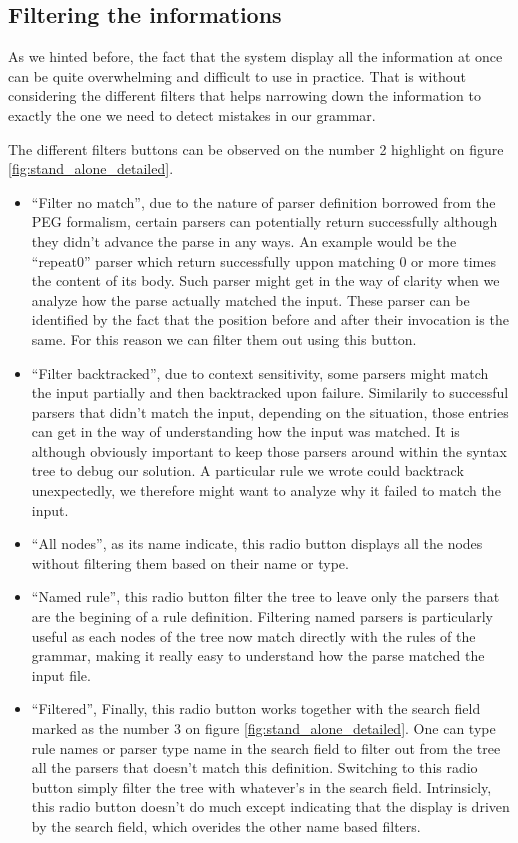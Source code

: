 	\subsection{Filtering the informations}
	As we hinted before, the fact that the system display all the information at once can be quite overwhelming and difficult to use in practice. That is without considering the different filters that helps narrowing down the information to exactly the one we need to detect mistakes in our grammar.

	\bigskip

	The different filters buttons can be observed on the number 2 highlight on figure \ref{fig:stand_alone_detailed}.

	\begin{itemize}
		\item ``Filter no match'', due to the nature of parser definition borrowed from the PEG formalism, certain parsers can potentially return successfully although they didn't advance the parse in any ways. An example would be the ``repeat0'' parser which return successfully uppon matching 0 or more times the content of its body. Such parser might get in the way of clarity when we analyze how the parse actually matched the input. These parser can be identified by the fact that the position before and after their invocation is the same. For this reason we can filter them out using this button. 
		\item ``Filter backtracked'', due to context sensitivity, some parsers might match the input partially and then backtracked upon failure. Similarily to successful parsers that didn't match the input, depending on the situation, those entries can get in the way of understanding how the input was matched. It is although obviously important to keep those parsers around within the syntax tree to debug our solution. A particular rule we wrote could backtrack unexpectedly, we therefore might want to analyze why it failed to match the input.
		\item ``All nodes'', as its name indicate, this radio button displays all the nodes without filtering them based on their name or type.
		\item ``Named rule'', this radio button filter the tree to leave only the parsers that are the begining of a rule definition. Filtering named parsers is particularly useful as each nodes of the tree now match directly with the rules of the grammar, making it really easy to understand how the parse matched the input file.
		\item ``Filtered'', Finally, this radio button works together with the search field marked as the number 3 on figure \ref{fig:stand_alone_detailed}. One can type rule names or parser type name in the search field to filter out from the tree all the parsers that doesn't match this definition. Switching to this radio button simply filter the tree with whatever's in the search field. Intrinsicly, this radio button doesn't do much except indicating that the display is driven by the search field, which overides the other name based filters. 
	\end{itemize}

